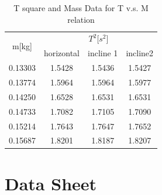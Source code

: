 \documentclass[12pt,a4paper]{article}
\begin{document}
 
\begin{table}[H]
    \centering
    \begin{tabular}{|c|c|c|c|}
    \hline
    \multirow{2}{*}{m[kg]} & \multicolumn{3}{c|}{$T^2$[$s^2$]}            \\ \cline{2-4} 
                       & horizontal & incline 1 & incline2 \\ \hline
    0.13303            & 1.5428     & 1.5436    & 1.5427   \\ \hline
    0.13774            & 1.5964     & 1.5964    & 1.5977   \\ \hline
    0.14250            & 1.6528     & 1.6531    & 1.6531   \\ \hline
    0.14733            & 1.7082     & 1.7105    & 1.7090   \\ \hline
    0.15214            & 1.7643     & 1.7647    & 1.7652   \\ \hline
    0.15687            & 1.8201     & 1.8187    & 1.8207   \\ \hline
    \end{tabular}
    \caption{T square and Mass Data for T v.s. M relation}
    \label{tsquaretable}
\end{table}

\section{Data Sheet}
\end{document}
